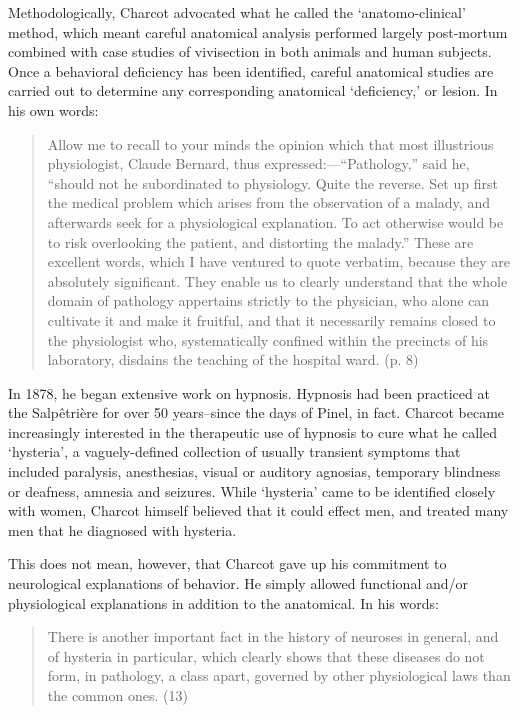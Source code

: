 \begin{refsection}
Methodologically, Charcot advocated what he called the `anatomo-clinical' method, which meant careful anatomical analysis performed largely post-mortum combined with case studies of vivisection in both animals and human subjects. Once a behavioral deficiency has been identified, careful anatomical studies are carried out to determine any corresponding anatomical `deficiency,' or lesion. In his own words:

\begin{quote}

Allow me to recall to your minds the opinion which that most illustrious physiologist, Claude Bernard, thus expressed:—“Pathology,” said he, “should not he subordinated to physiology. Quite the reverse. Set up first the medical problem which arises from the observation of a malady, and afterwards seek for a physiological explanation. To act otherwise would be to risk overlooking the patient, and distorting the malady.” These are excellent words, which I have ventured to quote verbatim, because they are absolutely significant. They enable us to clearly understand that the whole domain of pathology appertains strictly to the physician, who alone can cultivate it and make it fruitful, and that it necessarily remains closed to the physiologist who, systematically confined within the precincts of his laboratory, disdains the teaching of the hospital ward. (p. 8)
\end{quote}

In 1878, he began extensive work on hypnosis. Hypnosis had been practiced at the Salpêtrière for over 50 years--since the days of Pinel, in fact. Charcot became increasingly interested in the therapeutic use of hypnosis to cure what he called `hysteria', a vaguely-defined collection of usually transient symptoms that included paralysis, anesthesias, visual or auditory agnosias, temporary blindness or deafness, amnesia and seizures. While `hysteria' came to be identified closely with women, Charcot himself believed that it could effect men, and treated many men that he diagnosed with hysteria.

This does not mean, however, that Charcot gave up his commitment to neurological explanations of behavior. He simply allowed functional and\slash or physiological explanations in addition to the anatomical. In his words:

\begin{quote}

There is another important fact in the history of neuroses in general, and of hysteria in particular, which clearly shows that these diseases do not form, in pathology, a class apart, governed by other physiological laws than the common ones. (13)
\end{quote}


\end{refsection}
